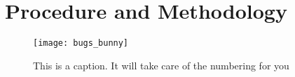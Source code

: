 \noindent \section{Procedure and Methodology} \vspace{-9mm} \hrulefill %

\indent \lipsum[1-2] %

\begin{figure}[H] %
	\centering %
	\texttt{[image: bugs\_bunny]} %
	\caption{This is a caption. It will take care of the numbering for you} %
	\vspace{-5mm}
\end{figure}